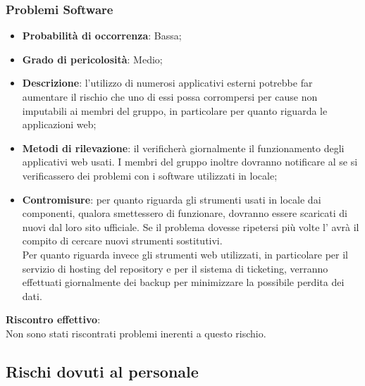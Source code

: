 		\subsubsection{Problemi Software} %
		\label{ssub:problemi_software}
			\begin{itemize}
				\item \textbf{Probabilità di occorrenza}: Bassa;
				\item \textbf{Grado di pericolosità}: Medio;
				\item \textbf{Descrizione}: l'utilizzo di numerosi applicativi esterni potrebbe far aumentare il rischio che uno di essi possa corrompersi per cause non imputabili ai membri del gruppo, in particolare per quanto riguarda le applicazioni web;
				\item \textbf{Metodi di rilevazione}: il \roleAdministrator{} verificherà giornalmente il funzionamento degli applicativi web usati. I membri del gruppo inoltre dovranno notificare al \roleAdministrator{} se si verificassero dei problemi con i software utilizzati in locale;
				\item \textbf{Contromisure}: per quanto riguarda gli strumenti usati in locale dai componenti, qualora smettessero di funzionare, dovranno essere scaricati di nuovi dal loro sito ufficiale. Se il problema dovesse ripetersi più volte l'\roleAdministrator{} avrà il compito di cercare nuovi strumenti sostitutivi. \\
				Per quanto riguarda invece gli strumenti web utilizzati, in particolare per il servizio di hosting del repository e per il sistema di ticketing, verranno effettuati giornalmente dei backup per minimizzare la possibile perdita dei dati.
			\end{itemize}
		\noindent
		\textbf{Riscontro effettivo}: \\
		Non sono stati riscontrati problemi inerenti a questo rischio.
		
	
	\subsection{Rischi dovuti al personale} %
	\label{sub:rischi_dovuti_al_personale}
